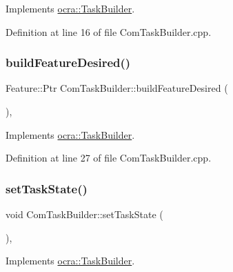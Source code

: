 Implements \hyperlink{classocra_1_1TaskBuilder_a58c0dc416a9607a344a080248ee26ac2}{ocra\+::\+Task\+Builder}.



Definition at line 16 of file Com\+Task\+Builder.\+cpp.

\hypertarget{classocra_1_1ComTaskBuilder_abdd4c74539a37ff4c719c0ac78812bf4}{}\label{classocra_1_1ComTaskBuilder_abdd4c74539a37ff4c719c0ac78812bf4} 
\subsubsection{\texorpdfstring{build\+Feature\+Desired()}{buildFeatureDesired()}}
{\footnotesize\ttfamily Feature\+::\+Ptr Com\+Task\+Builder\+::build\+Feature\+Desired (\begin{DoxyParamCaption}{ }\end{DoxyParamCaption})\hspace{0.3cm}{\ttfamily [protected]}, {\ttfamily [virtual]}}



Implements \hyperlink{classocra_1_1TaskBuilder_a7a2c8bcc5d95160d0e48806a2648f1a5}{ocra\+::\+Task\+Builder}.



Definition at line 27 of file Com\+Task\+Builder.\+cpp.

\hypertarget{classocra_1_1ComTaskBuilder_ab514d4644f7dfeec3ae84a5b0b8bbc34}{}\label{classocra_1_1ComTaskBuilder_ab514d4644f7dfeec3ae84a5b0b8bbc34} 
\subsubsection{\texorpdfstring{set\+Task\+State()}{setTaskState()}}
{\footnotesize\ttfamily void Com\+Task\+Builder\+::set\+Task\+State (\begin{DoxyParamCaption}{ }\end{DoxyParamCaption})\hspace{0.3cm}{\ttfamily [protected]}, {\ttfamily [virtual]}}



Implements \hyperlink{classocra_1_1TaskBuilder_a7b44bfa101566ea4400e2d9bfdb9ff32}{ocra\+::\+Task\+Builder}.



